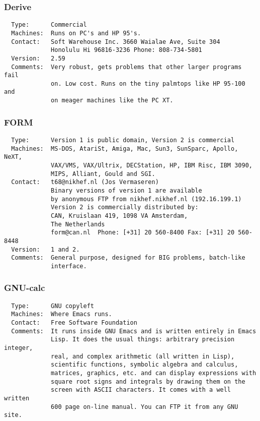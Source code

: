 \documentclass[twoside,11pt]{article}
\begin{document}
\newpage
\subsubsection{Derive}
\begin{verbatim}
  Type:      Commercial
  Machines:  Runs on PC's and HP 95's.
  Contact:   Soft Warehouse Inc. 3660 Waialae Ave, Suite 304
             Honolulu Hi 96816-3236 Phone: 808-734-5801
  Version:   2.59
  Comments:  Very robust, gets problems that other larger programs fail
             on. Low cost. Runs on the tiny palmtops like HP 95-100 and
             on meager machines like the PC XT.
\end{verbatim}

\subsubsection{FORM}
\begin{verbatim}
  Type:      Version 1 is public domain, Version 2 is commercial
  Machines:  MS-DOS, AtariSt, Amiga, Mac, Sun3, SunSparc, Apollo, NeXT,
             VAX/VMS, VAX/Ultrix, DECStation, HP, IBM Risc, IBM 3090,
             MIPS, Alliant, Gould and SGI.
  Contact:   t68@nikhef.nl (Jos Vermaseren)
             Binary versions of version 1 are available
             by anonymous FTP from nikhef.nikhef.nl (192.16.199.1)
             Version 2 is commercially distributed by:
             CAN, Kruislaan 419, 1098 VA Amsterdam,
             The Netherlands
             form@can.nl  Phone: [+31] 20 560-8400 Fax: [+31] 20 560-8448
  Version:   1 and 2.
  Comments:  General purpose, designed for BIG problems, batch-like
             interface.
\end{verbatim}

\subsubsection{GNU-calc}
\begin{verbatim}
  Type:      GNU copyleft
  Machines:  Where Emacs runs.
  Contact:   Free Software Foundation
  Comments:  It runs inside GNU Emacs and is written entirely in Emacs
             Lisp. It does the usual things: arbitrary precision integer,
             real, and complex arithmetic (all written in Lisp),
             scientific functions, symbolic algebra and calculus,
             matrices, graphics, etc. and can display expressions with
             square root signs and integrals by drawing them on the
             screen with ASCII characters. It comes with a well written
             600 page on-line manual. You can FTP it from any GNU site.
\end{verbatim}
\end{document}

